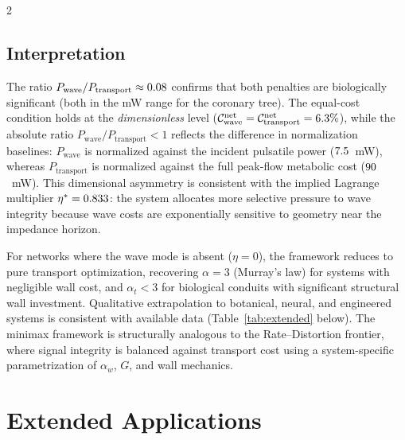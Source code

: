 \documentclass[11pt,a4paper]{article}
\begin{document}
\begin{multicols}{2}
\subsection{Interpretation}

The ratio $P_{\mathrm{wave}}/P_{\mathrm{transport}} \approx 0.08$ confirms
that both penalties are biologically significant (both in the mW range for the
coronary tree). The equal-cost condition holds at the \emph{dimensionless} level
($\mathcal{C}^{\mathrm{net}}_{\mathrm{wave}} =
\mathcal{C}^{\mathrm{net}}_{\mathrm{transport}} = 6.3\%$), while the
absolute ratio $P_{\mathrm{wave}}/P_{\mathrm{transport}} < 1$ reflects the
difference in normalization baselines: $P_{\mathrm{wave}}$ is normalized against
the incident pulsatile power ($7.5$~mW), whereas
$P_{\mathrm{transport}}$ is normalized against the full peak-flow metabolic cost
($90$~mW). This dimensional asymmetry is consistent with the
implied Lagrange multiplier $\eta^* = 0.833$: the system allocates more
selective pressure to wave integrity because wave costs are exponentially
sensitive to geometry near the impedance horizon.

\end{multicols}

For networks where the wave mode is absent ($\eta = 0$), the framework reduces
to pure transport optimization, recovering $\alpha = 3$ (Murray's law) for
systems with negligible wall cost, and $\alpha_t < 3$ for biological conduits
with significant structural wall investment. Qualitative extrapolation to
botanical, neural, and engineered systems is consistent with available data
(Table~\ref{tab:extended} below). The minimax framework is structurally
analogous to the Rate--Distortion frontier, where signal integrity is balanced
against transport cost using a system-specific parametrization of $\alpha_w$,
$G$, and wall mechanics.

\section{Extended Applications}
\label{sec:applications}
\end{document}
